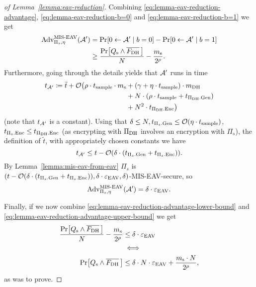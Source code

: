 \begin{proof}[of Lemma~\ref{lemma:eav-reduction}]
	Combining \eqref{eq:lemma-eav-reduction-advantage}, \eqref{eq:lemma-eav-reduction-b=0} and \eqref{eq:lemma-eav-reduction-b=1} we get
	\begin{align} \label{eq:lemma-eav-reduction-advantage-lower-bound}
		\begin{split}
			\advantage{\Pi_s}{\eta}{MIS\text{-}EAV}(\adv') & = \pr{0 \from \adv' \mid b = 0} - \pr{0 \from \adv' \mid b = 1}           \\
			& \ge \frac{\pr{\qs \land \overline{\fdh}\,}}{N} - \frac{\ms}{2^\rho}.
		\end{split}
	\end{align}
	Furthermore, going through the details yields that $\mathcal{A}'$ runs in time
	\begin{align*}
		\begin{split}
			t_{\mathcal{A}'} \coloneqq \tilde{t} + \mathcal{O}\big(\rho \cdot t_{\mathrm{sample}} \cdot m_\mathrm{s} & + (\gamma + \eta \cdot t_{\mathrm{sample}}) \cdot m_\mathrm{DH}  \\
			& + N \cdot (\rho \cdot t_{\mathrm{sample}} + t_{\Pi_{\mathrm{DH}}.\mathrm{Gen}})  \\
			& +  N^2 \cdot t_{\Pi_{\mathrm{DH}}.\mathrm{Enc}}\big)
		\end{split}
	\end{align*}
	(note that $t_{\mathcal{A}'}$ is a constant).
	Using that $\delta \le N, t_{\Pi_s.\mathrm{Gen}} \le \mathcal{O}(\eta \cdot t_{\mathrm{sample}})$, $t_{\Pi_s.\mathrm{Enc}} \le t_{\Pi_{\mathrm{DH}}.\mathrm{Enc}}$ (as encrypting with $\Pi_{\mathrm{DH}}$ involves an encryption with $\Pi_s$), the definition of $\tilde{t}$, with appropriately chosen constants we have
	\[
		t_{\mathcal{A}'} \le t - \mathcal{O}(\delta \cdot (t_{\Pi_s.\mathrm{Gen}} + t_{\Pi_s.\mathrm{Enc}})).
	\]
	By Lemma~\ref{lemma:mis-eav-from-eav} $\Pi_s$ is $(t - \mathcal{O}(\delta \cdot (t_{\Pi_s.\mathrm{Gen}} + t_{\Pi_s.\mathrm{Enc}})), \delta \cdot \varepsilon_\mathrm{EAV}, \delta)$-MIS-EAV-secure, so
	\begin{equation} \label{eq:lemma-eav-reduction-advantage-upper-bound}
		\mathrm{Adv}_{\Pi_s, \eta}^{\mathrm{MIS\text{-}EAV}}(\mathcal{A}') = \delta \cdot \varepsilon_\mathrm{EAV}.
	\end{equation}

	Finally, if we now combine \eqref{eq:lemma-eav-reduction-advantage-lower-bound} and \eqref{eq:lemma-eav-reduction-advantage-upper-bound} we get
	\begin{align*}
		\frac{\pr{\qs \land \overline{\fdh}\,}}{N} - \frac{\ms}{2^\rho} & \le \delta \cdot \eeav                                       \\
		                                                                & \iff                                                         \\
		\pr{\qs \land \overline{\fdh}\,}                                & \le \delta \cdot N \cdot \eeav + \frac{\ms \cdot N}{2^\rho},
	\end{align*}
	as was to prove.
\end{proof}


